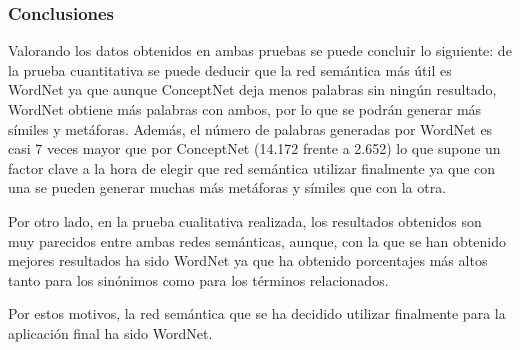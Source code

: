 \subsubsection{Conclusiones}
\label{sssec:conclusionPruebas}

Valorando los datos obtenidos en ambas pruebas se puede concluir lo siguiente: de la prueba cuantitativa se puede deducir que la red semántica más útil es WordNet ya que aunque ConceptNet deja menos palabras sin ningún resultado, WordNet obtiene más palabras con ambos, por lo que se podrán generar más símiles y metáforas. Además, el número de palabras generadas por WordNet es casi 7 veces mayor que por ConceptNet (14.172 frente a 2.652) lo que supone un factor clave a la hora de elegir que red semántica utilizar finalmente ya que con una se pueden generar muchas más metáforas y símiles que con la otra.

Por otro lado, en la prueba cualitativa realizada, los resultados obtenidos son muy parecidos entre ambas redes semánticas, aunque, con la que se han obtenido mejores resultados ha sido WordNet ya que ha obtenido porcentajes más altos tanto para los sinónimos como para los términos relacionados.

Por estos motivos, la red semántica que se ha decidido utilizar finalmente para la aplicación final ha sido WordNet.



